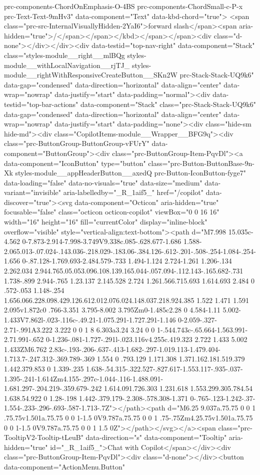 {{{prc-components-ChordOnEmphasis-O-4BS prc-components-ChordSmall-c-P-x prc-Text-Text-9mHv3" data-component="Text" data-kbd-chord="true"> <span class="prc-src-InternalVisuallyHidden-2YaI6">forward slash</span><span aria-hidden="true">/</span></span></kbd></span></span><div class="d-none"></div></div><div data-testid="top-nav-right" data-component="Stack" class="styles-module__right__mlBQg styles-module__withLocalNavigation__rjTJ_ styles-module__rightWithResponsiveCreateButton__SKn2W prc-Stack-Stack-UQ9k6" data-gap="condensed" data-direction="horizontal" data-align="center" data-wrap="nowrap" data-justify="start" data-padding="normal"><div data-testid="top-bar-actions" data-component="Stack" class="prc-Stack-Stack-UQ9k6" data-gap="condensed" data-direction="horizontal" data-align="center" data-wrap="nowrap" data-justify="start" data-padding="none"><div class="hide-sm hide-md"><div class="CopilotItems-module__Wrapper__BFG9q"><div class="prc-ButtonGroup-ButtonGroup-vFUrY" data-component="ButtonGroup"><div class="prc-ButtonGroup-Item-PqvDl"><a data-component="IconButton" type="button" class="prc-Button-ButtonBase-9n-Xk styles-module__appHeaderButton__axedQ prc-Button-IconButton-fyge7" data-loading="false" data-no-visuals="true" data-size="medium" data-variant="invisible" aria-labelledby="_R_1aif5_" href="/copilot" data-discover="true"><svg data-component="Octicon" aria-hidden="true" focusable="false" class="octicon octicon-copilot" viewBox="0 0 16 16" width="16" height="16" fill="currentColor" display="inline-block" overflow="visible" style="vertical-align:text-bottom"><path d="M7.998 15.035c-4.562 0-7.873-2.914-7.998-3.749V9.338c.085-.628.677-1.686 1.588-2.065.013-.07.024-.143.036-.218.029-.183.06-.384.126-.612-.201-.508-.254-1.084-.254-1.656 0-.87.128-1.769.693-2.484.579-.733 1.494-1.124 2.724-1.261 1.206-.134 2.262.034 2.944.765.05.053.096.108.139.165.044-.057.094-.112.143-.165.682-.731 1.738-.899 2.944-.765 1.23.137 2.145.528 2.724 1.261.566.715.693 1.614.693 2.484 0 .572-.053 1.148-.254 1.656.066.228.098.429.126.612.012.076.024.148.037.218.924.385 1.522 1.471 1.591 2.095v1.872c0 .766-3.351 3.795-8.002 3.795Zm0-1.485c2.28 0 4.584-1.11 5.002-1.433V7.862l-.023-.116c-.49.21-1.075.291-1.727.291-1.146 0-2.059-.327-2.71-.991A3.222 3.222 0 0 1 8 6.303a3.24 3.24 0 0 1-.544.743c-.65.664-1.563.991-2.71.991-.652 0-1.236-.081-1.727-.291l-.023.116v4.255c.419.323 2.722 1.433 5.002 1.433ZM6.762 2.83c-.193-.206-.637-.413-1.682-.297-1.019.113-1.479.404-1.713.7-.247.312-.369.789-.369 1.554 0 .793.129 1.171.308 1.371.162.181.519.379 1.442.379.853 0 1.339-.235 1.638-.54.315-.322.527-.827.617-1.553.117-.935-.037-1.395-.241-1.614Zm4.155-.297c-1.044-.116-1.488.091-1.681.297-.204.219-.359.679-.242 1.614.091.726.303 1.231.618 1.553.299.305.784.54 1.638.54.922 0 1.28-.198 1.442-.379.179-.2.308-.578.308-1.371 0-.765-.123-1.242-.37-1.554-.233-.296-.693-.587-1.713-.7Z"></path><path d="M6.25 9.037a.75.75 0 0 1 .75.75v1.501a.75.75 0 0 1-1.5 0V9.787a.75.75 0 0 1 .75-.75Zm4.25.75v1.501a.75.75 0 0 1-1.5 0V9.787a.75.75 0 0 1 1.5 0Z"></path></svg></a><span class="prc-TooltipV2-Tooltip-tLeuB" data-direction="s" data-component="Tooltip" aria-hidden="true" id="_R_1aif5_">Chat with Copilot</span></div><div class="prc-ButtonGroup-Item-PqvDl"><div class="d-none"></div><button data-component="ActionMenu.Button" }}}

